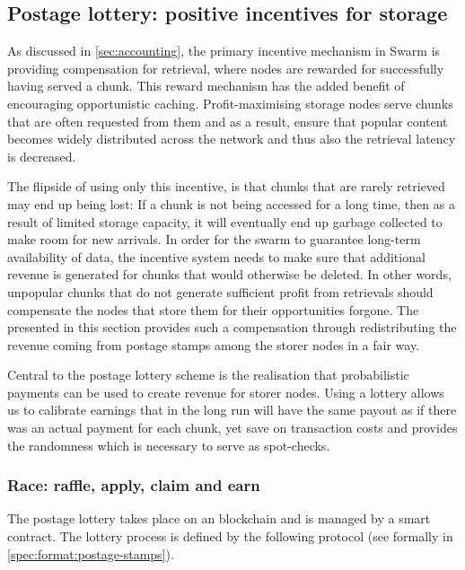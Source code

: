 \subsection{Postage lottery: positive incentives for storage \statusyellow}\label{sec:postage-lottery}

\yellow{}

As discussed in \ref{sec:accounting}, the primary incentive mechanism in Swarm is providing compensation for retrieval, where nodes are rewarded for successfully having served a chunk. This reward mechanism has the added benefit of encouraging opportunistic caching. Profit-maximising storage nodes serve chunks that are often requested from them and as a result, ensure that popular content becomes widely distributed across the network and thus also the retrieval latency is decreased.

The flipside of using only this incentive, is that chunks that are rarely retrieved may end up being lost: If a chunk is not being accessed for a long time, then as a result of limited storage capacity, it will eventually end up garbage collected to make room for new arrivals. In order for the swarm to guarantee long-term availability of data, the incentive system needs to make sure that additional revenue is generated for chunks that would otherwise be deleted. In other words, unpopular chunks that do not generate sufficient profit from retrievals should compensate the nodes that store them for their opportunities forgone. The  presented in this section provides such a compensation through redistributing the revenue coming from postage stamps among the storer nodes in a fair way.



Central to the postage lottery scheme is the realisation that probabilistic payments can be used to create revenue for storer nodes.
Using a lottery allows us to calibrate earnings that in the long run will have the same payout as if there was an actual payment for each chunk, yet save on transaction costs and provides the randomness which is necessary to serve as spot-checks.


\subsubsection{Race: raffle, apply, claim and earn}

The postage lottery takes place on an  blockchain and is managed by a smart contract. The lottery process is defined by the following protocol (see formally in \ref{spec:format:postage-stamps}). 

